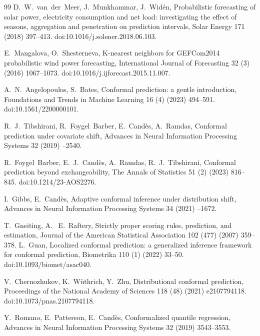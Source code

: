 \documentclass[preprint,3p,times]{elsarticle}
\providecommand{\DIFaddtex}[1]{{\protect\color{blue} \sf #1}} %
\providecommand{\DIFdeltex}[1]{{\protect\color{red} \scriptsize #1}} %
\providecommand{\DIFaddbegin}{} %
\providecommand{\DIFaddend}{} %
\providecommand{\DIFdelbegin}{} %
\providecommand{\DIFdelend}{} %
\providecommand{\DIFadd}[1]{\texorpdfstring{\DIFaddtex{#1}}{#1}} %
\providecommand{\DIFdel}[1]{\texorpdfstring{\DIFdeltex{#1}}{}} %
\begin{document}
\begin{thebibliography}{99}
\DIFadd{D.~W.~van~der~Meer, J.~Munkhammar, J.~Wid\'en,
Probabilistic forecasting of solar power, electricity consumption and net load: investigating the effect of seasons, aggregation and penetration on prediction intervals,
Solar Energy 171 (2018) 397--413.
doi:10.1016/j.solener.2018.06.103.
}

\DIFadd{E.~Mangalova, O.~Shesterneva,
K-nearest neighbors for GEFCom2014 probabilistic wind power forecasting,
International Journal of Forecasting 32 (3) (2016) 1067--1073.
doi:10.1016/j.ijforecast.2015.11.007.
}

\DIFaddend {}
A.~N.~Angelopoulos, S.~Bates,
Conformal prediction: a gentle introduction,
Foundations and Trends in Machine Learning 16 (4) (2023) 494--591.
\DIFaddbegin \DIFadd{doi:10.1561/2200000101.
}\DIFaddend 

R.~J.~Tibshirani, R.~Foygel~Barber, E.~Cand\`es, A.~Ramdas,
Conformal prediction under covariate shift,
Advances in Neural Information Processing Systems 32 (2019) \DIFaddbegin \DIFadd{2530--2540}\DIFaddend .

R.~Foygel~Barber, E.~J.~Cand\`es, A.~Ramdas, R.~J.~Tibshirani,
Conformal prediction beyond exchangeability,
The Annals of Statistics 51 (2) (2023) 816--845.
\DIFaddbegin \DIFadd{doi:10.1214/23-AOS2276.
}\DIFaddend 

I.~Gibbs, E.~Cand\`es,
Adaptive conformal inference under distribution shift,
Advances in Neural Information Processing Systems 34 (2021) \DIFaddbegin \DIFadd{1660--1672}\DIFaddend .

\DIFdelbegin {}
\DIFdel{T.~Gneiting,
A.
~E.~Raftery, Strictly proper scoring rules,
prediction, and estimation,
Journal of the American Statistical Association 102 (477) (2007) 359--378.
}\DIFdelend \DIFaddbegin {}
\DIFadd{L.~Guan,
Localized conformal prediction: a generalized inference framework for conformal prediction,
Biometrika 110 (1) (2022) 33--50.
doi:10.1093/biomet/asac040.
}\DIFaddend 

\DIFaddbegin {}
\DIFadd{V.~Chernozhukov, K.~W\"uthrich, Y.~Zhu,
Distributional conformal prediction,
Proceedings of the National Academy of Sciences 118 (48) (2021) e2107794118.
doi:10.1073/pnas.2107794118.
}

\DIFadd{Y.~Romano, E.~Patterson, E.~Cand\`es,
Conformalized quantile regression,
Advances in Neural Information Processing Systems 32 (2019) 3543--3553.
}


\end{thebibliography}
\end{document}
